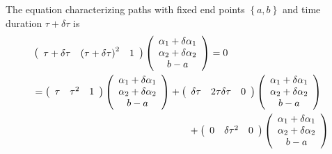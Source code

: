\documentclass[aps,preprint]{revtex4}
\begin{document}
The equation characterizing paths with fixed end points $\left\{ a,b\right\}
$ and time duration $\tau +\delta \tau $ is
\begin{align}
& \left(
\begin{array}{ccc}
\tau +\delta \tau & \left( \tau +\delta \tau \right) ^{2} & 1%
\end{array}%
\right) \left(
\begin{array}{c}
\alpha _{1}+\delta \alpha _{1} \\
\alpha _{2}+\delta \alpha _{2} \\
b-a%
\end{array}%
\right) =0  \notag \\
& =\left(
\begin{array}{ccc}
\tau & \tau ^{2} & 1%
\end{array}%
\right) \left(
\begin{array}{c}
\alpha _{1}+\delta \alpha _{1} \\
\alpha _{2}+\delta \alpha _{2} \\
b-a%
\end{array}%
\right) +\left(
\begin{array}{ccc}
\delta \tau & 2\tau \delta \tau & 0%
\end{array}%
\right) \left(
\begin{array}{c}
\alpha _{1}+\delta \alpha _{1} \\
\alpha _{2}+\delta \alpha _{2} \\
b-a%
\end{array}%
\right)  \notag \\
& \qquad \qquad \qquad \qquad \qquad \qquad \qquad \qquad +\left(
\begin{array}{ccc}
0 & \delta \tau ^{2} & 0%
\end{array}%
\right) \left(
\begin{array}{c}
\alpha _{1}+\delta \alpha _{1} \\
\alpha _{2}+\delta \alpha _{2} \\
b-a%
\end{array}%
\right)
\end{align}
\end{document}
